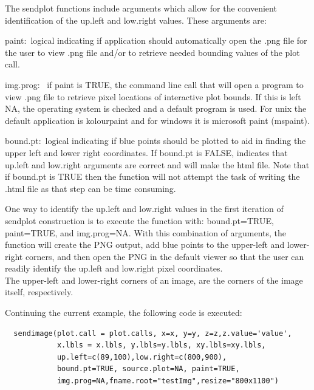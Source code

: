 \documentclass[]{article}
\begin{document}
\indent The sendplot functions  include arguments which allow for the convenient identification of the up.left and low.right values. These arguments are:

\begin{description}
 \item{paint:~}{logical indicating if application should
    automatically open the .png file for the user to view .png file and/or
    to retrieve needed bounding values of the plot call.}

  \item{img.prog:~ }{if paint is TRUE, the command line call that will open
    a program to view .png file to retrieve pixel locations of interactive
    plot bounds. If this is left NA, the operating system is checked and
    a default program is used. For unix the default application is
    kolourpaint and for windows it is microsoft paint (mspaint).}

  \item{bound.pt:~}{logical indicating if blue points should be plotted to
    aid in finding the upper left and lower right coordinates. If
    bound.pt is FALSE, indicates that up.left and low.right arguments
    are correct and will make the html file. Note that if bound.pt is TRUE then the function will not
    attempt the task of writing the .html file as that step can be time consuming.}

 \end{description}
One way to identify the up.left and low.right values in the first iteration of sendplot construction is to execute the function with: bound.pt=TRUE, paint=TRUE, and img.prog=NA. With this combination of arguments, the function will create the PNG output, add blue points to the upper-left and lower-right corners, and then open the PNG in the default viewer so that the user can readily identify the up.left and low.right pixel coordinates. \\

 The upper-left and lower-right corners of an image, are the corners of the image itself, respectively.\newline

\indent Continuing the current example, the following code is executed:
\begin{verbatim}
  sendimage(plot.call = plot.calls, x=x, y=y, z=z,z.value='value',
            x.lbls = x.lbls, y.lbls=y.lbls, xy.lbls=xy.lbls,
            up.left=c(89,100),low.right=c(800,900),
            bound.pt=TRUE, source.plot=NA, paint=TRUE,
            img.prog=NA,fname.root="testImg",resize="800x1100")
\end{verbatim}
\end{document}
